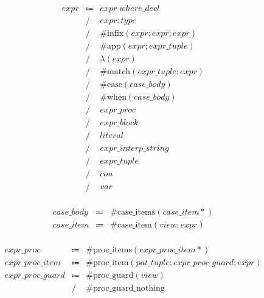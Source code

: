 \begin{align*}
    \begin{array}{rcll}
        \mathit{expr}
        &\Coloneq &\mathit{expr}\; \mathit{where\_decl} \\
        &\mathrel{/} &\mathit{expr}: \mathit{type} \\
        &\mathrel{/} &\mathrm{\#infix}(\mathit{expr}; \mathit{expr}; \mathit{expr}) \\
        &\mathrel{/} &\mathrm{\#app}(\mathit{expr}; \mathit{expr\_tuple}) \\
        &\mathrel{/} &\lambda(\mathit{expr}) \\
        &\mathrel{/} &\mathrm{\#match}(\mathit{expr\_tuple}; \mathit{expr}) \\
        &\mathrel{/} &\mathrm{\#case}(\mathit{case\_body}) \\
        &\mathrel{/} &\mathrm{\#when}(\mathit{case\_body}) \\
        &\mathrel{/} &\mathit{expr\_proc} \\
        &\mathrel{/} &\mathit{expr\_block} \\
        &\mathrel{/} &\mathit{literal} \\
        &\mathrel{/} &\mathit{expr\_interp\_string} \\
        &\mathrel{/} &\mathit{expr\_tuple} \\
        &\mathrel{/} &\mathit{con} \\
        &\mathrel{/} &\mathit{var}
    \end{array}
\end{align*}

\begin{align*}
    \begin{array}{rcll}
        \mathit{case\_body}
        &\Coloneq &\mathrm{\#case\_items}(\mathit{case\_item}{*}) \\
        \mathit{case\_item}
        &\Coloneq &\mathrm{\#case\_item}(\mathit{view}; \mathit{expr})
    \end{array}
\end{align*}

\begin{align*}
    \begin{array}{rcll}
        \mathit{expr\_proc}
        &\Coloneq &\mathrm{\#proc\_items}(\mathit{expr\_proc\_item}{*}) \\
        \mathit{expr\_proc\_item}
        &\Coloneq &\mathrm{\#proc\_item}(\mathit{pat\_tuple}; \mathit{expr\_proc\_guard}; \mathit{expr}) \\
        \mathit{expr\_proc\_guard}
        &\Coloneq &\mathrm{\#proc\_guard}(\mathit{view}) \\
        &\mathrel{/} &\mathrm{\#proc\_guard\_nothing}
    \end{array}
\end{align*}

